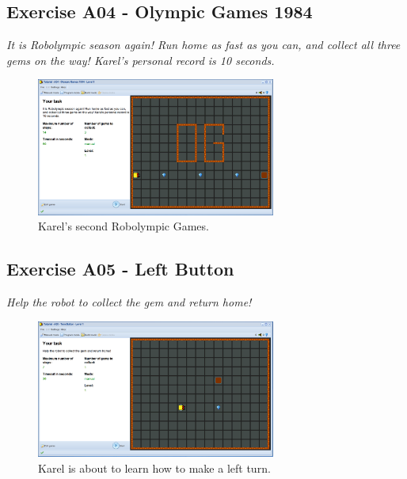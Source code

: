 \documentclass[article,A4,12pt]{llncs}
\begin{document}
\subsection{Exercise A04 - Olympic Games 1984}

{\em It is Robolympic season again! Run home as fast as you can, 
and collect all three gems on the way! Karel's personal record is 10 seconds.}


\begin{figure}[!ht]
\begin{center}
\includegraphics[width=0.7\textwidth]{img/a04.png}
\end{center}
\vspace{-4mm}
\caption{Karel's second Robolympic Games.}
\label{fig:a04}
\vspace{-1cm}
\end{figure}
\noindent
\newpage


\subsection{Exercise A05 - Left Button}

{\em Help the robot to collect the gem and return home!}

\begin{figure}[!ht]
\begin{center}
\includegraphics[width=0.7\textwidth]{img/a05.png}
\end{center}
\vspace{-4mm}
\caption{Karel is about to learn how to make a left turn.}
\label{fig:a05}
\vspace{-1cm}
\end{figure}
\noindent
\end{document}
